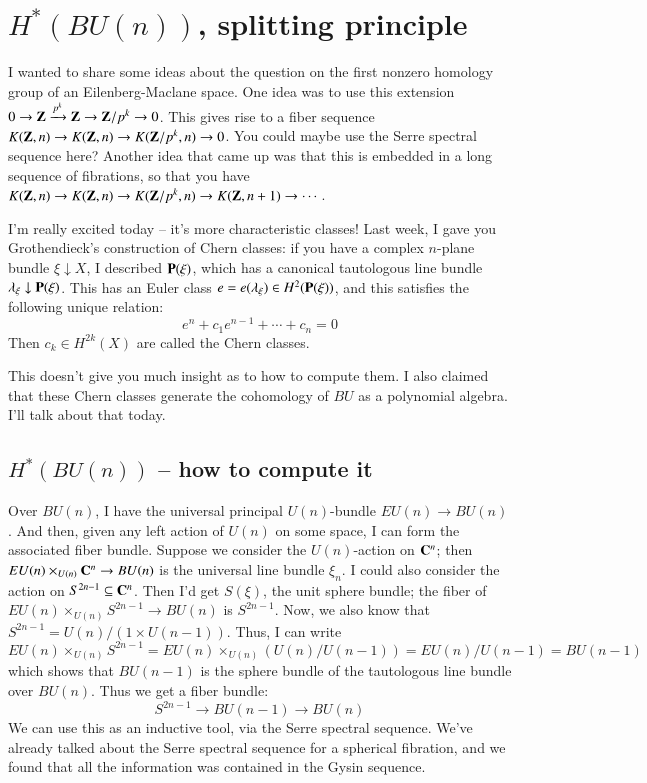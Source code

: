 \section{$H^\ast(BU(n))$, splitting principle}
I wanted to share some ideas about the question on the first nonzero homology group of an Eilenberg-Maclane space.
One idea was to use this extension $0\to \mathbf Z\xrightarrow{{p^k}}\mathbf Z\to \mathbf Z/p^k\to 0$.
This gives rise to a fiber sequence $K(\mathbf Z,n)\to K(\mathbf Z,n)\to K(\mathbf Z/p^k,n)\to 0$.
You could maybe use the Serre spectral sequence here?
Another idea that came up was that this is embedded in a long sequence of fibrations, so that you have $K(\mathbf Z,n)\to K(\mathbf Z,n)\to K(\mathbf Z/p^k, n) \to K(\mathbf Z,n+1)\to\cdots$.

I'm really excited today -- it's more characteristic classes!
Last week, I gave you Grothendieck's construction of Chern classes:
if you have a complex $n$-plane bundle $\xi\downarrow X$, I described $\mathbf P(\xi)$, which has a canonical tautologous line bundle $\lambda_\xi\downarrow \mathbf P(\xi)$.
This has an Euler class $e=e(\lambda_\xi)\in H^2(\mathbf P(\xi))$, and this satisfies the following unique relation:
$$
e^n+c_1e^{n-1} + \cdots + c_n = 0
$$
Then $c_k\in H^{2k}(X)$ are called the Chern classes.

This doesn't give you much insight as to how to compute them.
I also claimed that these Chern classes generate the cohomology of $BU$ as a polynomial algebra.
I'll talk about that today.
\subsection{$H^\ast(BU(n))$ -- how to compute it}
Over $BU(n)$, I have the universal principal $U(n)$-bundle $EU(n)\to BU(n)$.
And then, given any left action of $U(n)$ on some space, I can form the associated fiber bundle.
Suppose we consider the $U(n)$-action on $\mathbf C^n$; then $EU(n)\times_{U(n)}\mathbf C^n\to BU(n)$ is the universal line bundle $\xi_n$.
I could also consider the action on $S^{2n-1}\subseteq \mathbf C^n$.
Then I'd get $S(\xi)$, the unit sphere bundle; the fiber of $EU(n)\times_{U(n)}S^{2n-1}\to BU(n)$ is $S^{2n-1}$.
Now, we also know that $S^{2n-1} = U(n)/(1\times U(n-1))$.
Thus, I can write
$$EU(n)\times_{U(n)}S^{2n-1} = EU(n)\times_{U(n)} (U(n)/U(n-1)) = EU(n)/U(n-1) = BU(n-1)$$
which shows that $BU(n-1)$ is the sphere bundle of the tautologous line bundle over $BU(n)$.
Thus we get a fiber bundle:
$$
S^{2n-1}\to BU(n-1)\to BU(n)
$$
We can use this as an inductive tool, via the Serre spectral sequence.
We've already talked about the Serre spectral sequence for a spherical fibration, and we found that all the information was contained in the Gysin sequence.

